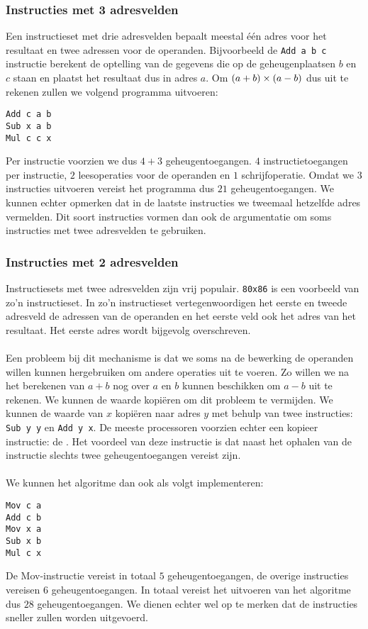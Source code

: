 \subsubsection{Instructies met 3 adresvelden}
Een instructieset met drie adresvelden bepaalt meestal \'e\'en adres voor het resultaat en twee adressen voor de operanden. Bijvoorbeeld de \verb+Add a b c+ instructie berekent de optelling van de gegevens die op de geheugenplaatsen $b$ en $c$ staan en plaatst het resultaat dus in adres $a$. Om $\left( a+b \right)\times\left( a-b \right)$ dus uit te rekenen zullen we volgend programma uitvoeren:
\begin{verbatim}
Add c a b
Sub x a b
Mul c c x
\end{verbatim}
Per instructie voorzien we dus $4+3$ geheugentoegangen. $4$ instructietoegangen per instructie, $2$ leesoperaties voor de operanden en $1$ schrijfoperatie. Omdat we $3$ instructies uitvoeren vereist het programma dus $21$ geheugentoegangen. We kunnen echter opmerken dat in de laatste instructies we tweemaal hetzelfde adres vermelden. Dit soort instructies vormen dan ook de argumentatie om soms instructies met twee adresvelden te gebruiken.
\subsubsection{Instructies met 2 adresvelden}
Instructiesets met twee adresvelden zijn vrij populair. \verb+80x86+ is een voorbeeld van zo'n instructieset. In zo'n instructieset vertegenwoordigen het eerste en tweede adresveld de adressen van de operanden en het eerste veld ook het adres van het resultaat. Het eerste adres wordt bijgevolg overschreven.
\paragraph{}
Een probleem bij dit mechanisme is dat we soms na de bewerking de operanden willen kunnen hergebruiken om andere operaties uit te voeren. Zo willen we na het berekenen van $a+b$ nog over $a$ en $b$ kunnen beschikken om $a-b$ uit te rekenen. We kunnen de waarde kopi\"eren om dit probleem te vermijden. We kunnen de waarde van $x$ kopi\"eren naar adres $y$ met behulp van twee instructies: \verb+Sub y y+ en \verb+Add y x+. De meeste processoren voorzien echter een kopieer instructie: de . Het voordeel van deze instructie is dat naast het ophalen van de instructie slechts twee geheugentoegangen vereist zijn.
\paragraph{}
We kunnen het algoritme dan ook als volgt implementeren:
\begin{verbatim}
Mov c a
Add c b
Mov x a
Sub x b
Mul c x
\end{verbatim}
De Mov-instructie vereist in totaal $5$ geheugentoegangen, de overige instructies vereisen $6$ geheugentoegangen. In totaal vereist het uitvoeren van het algoritme dus $28$ geheugentoegangen. We dienen echter wel op te merken dat de instructies sneller zullen worden uitgevoerd.
